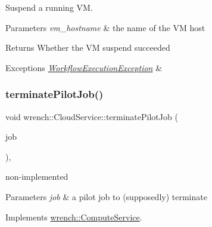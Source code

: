 Suspend a running VM. 


\begin{DoxyParams}{Parameters}
{\em vm\+\_\+hostname} & the name of the VM host\\
\hline
\end{DoxyParams}
\begin{DoxyReturn}{Returns}
Whether the VM suspend succeeded
\end{DoxyReturn}

\begin{DoxyExceptions}{Exceptions}
{\em \hyperlink{classwrench_1_1_workflow_execution_exception}{Workflow\+Execution\+Exception}} & \\
\hline
\end{DoxyExceptions}
\mbox{\label{classwrench_1_1_cloud_service_a6e0e6b374e18a80cdd2224235520eafd}} 
\subsubsection{\texorpdfstring{terminate\+Pilot\+Job()}{terminatePilotJob()}}
{\footnotesize\ttfamily void wrench\+::\+Cloud\+Service\+::terminate\+Pilot\+Job (\begin{DoxyParamCaption}\item[{\hyperlink{classwrench_1_1_pilot_job}{Pilot\+Job} $\ast$}]{job }\end{DoxyParamCaption})\hspace{0.3cm}{\ttfamily [override]}, {\ttfamily [virtual]}}



non-\/implemented 


\begin{DoxyParams}{Parameters}
{\em job} & a pilot job to (supposedly) terminate \\
\hline
\end{DoxyParams}


Implements \hyperlink{classwrench_1_1_compute_service}{wrench\+::\+Compute\+Service}.

\mbox{\label{classwrench_1_1_cloud_service_a4ffac0e06760339dc333a2c859682331}} 
